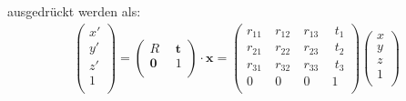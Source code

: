 ausgedrückt werden als:
\begin{eqnarray}
\left(
\begin{array}{c}
x'\\
y'\\
z'\\
1\\
\end{array}
\right) =
\left(
\begin{array}{c|c}
R\ & \ \bm{t}\\
\hline
\bm{0}\ & \ 1\\
\end{array}
\right)
\cdot\bm{x} =
\left(
\begin{array}{ccc|c}
r_{11}\ & r_{12}\ & r_{13}\ & \ t_1\\
r_{21}\ & r_{22}\ & r_{23}\ & \ t_2\\
r_{31}\ & r_{32}\ & r_{33}\ & \ t_3\\
\hline
0\ & 0\ & 0\ & 1\\
\end{array}
\right)
\left(
\begin{array}{c}
x\\
y\\
z\\
1\\
\end{array}
\right)%
\end{eqnarray}

